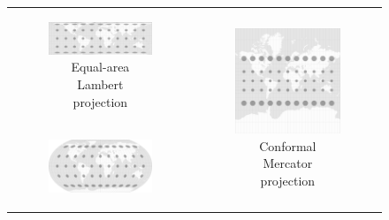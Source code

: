 \begin{figure}[H]
  \centering
  \begin{tabular}{c c}
    \begin{subfigure}{0.5\textwidth}
      \centering
      \includegraphics[width=0.9\linewidth]{graphics/basics/hgis/projection_distortion_lambert.png}
      \caption{Equal-area Lambert projection}
    \end{subfigure}
    &
    \multirow{2}{*}{
      \begin{subfigure}{0.4\textwidth}
        \vspace{-2.8em}
        \centering
        \includegraphics[width=0.9\linewidth]{graphics/basics/hgis/projection_distortion_mercator.png}
        \caption{Conformal Mercator projection}
        \label{fig:mercator}
      \end{subfigure}
    } \\
    \begin{subfigure}{0.5\textwidth}
      \vspace{1em}
      \centering
      \includegraphics[width=0.9\linewidth]{graphics/basics/hgis/projection_distortion_robinson.png}

\end{subfigure}
\end{tabular}
\end{figure}
